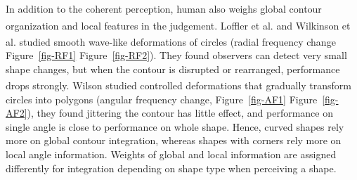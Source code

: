\documentclass[
  letterpaper,
  DIV=11,
  numbers=noendperiod]{scrartcl}
\begin{document}
In addition to the coherent perception, human also weighs global contour
organization and local features in the judgement. Loffler et
al.\textsuperscript{} and Wilkinson
et al.\textsuperscript{}
studied smooth wave-like deformations of circles (radial frequency
change Figure~\ref{fig-RF1} Figure~\ref{fig-RF2}). They found observers
can detect very small shape changes, but when the contour is disrupted
or rearranged, performance drops strongly.
Wilson\textsuperscript{} studied
controlled deformations that gradually transform circles into polygons
(angular frequency change, Figure~\ref{fig-AF1} Figure~\ref{fig-AF2}),
they found jittering the contour has little effect, and performance on
single angle is close to performance on whole shape. Hence, curved
shapes rely more on global contour integration, whereas shapes with
corners rely more on local angle information. Weights of global and
local information are assigned differently for integration depending on
shape type when perceiving a shape.
\end{document}
